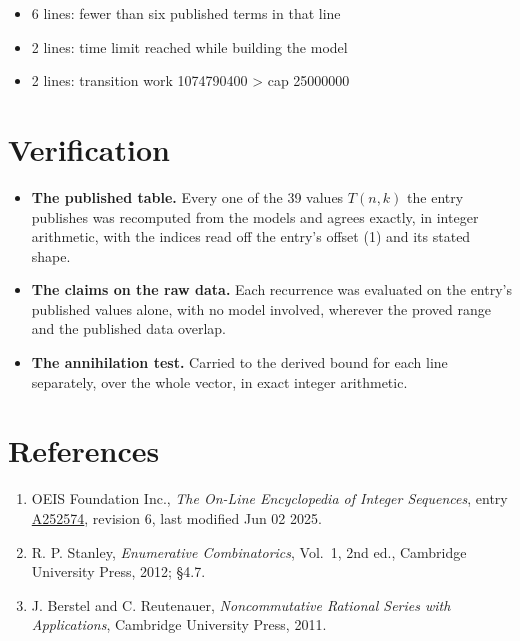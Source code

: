 \documentclass[11pt]{article}
\theoremstyle{definition}
\begin{document}
\begin{itemize}

\item 6 lines: fewer than six published terms in that line

\item 2 lines: time limit reached while building the model

\item 2 lines: transition work 1074790400 > cap 25000000

\end{itemize}

\section{Verification}

\begin{itemize}

\item {\bfseries The published table.} Every one of the 39 values $T(n,k)$ the entry publishes was recomputed from the models and agrees exactly, in integer arithmetic, with the indices read off the entry's offset (1) and its stated shape.

\item {\bfseries The claims on the raw data.} Each recurrence was evaluated on the entry's published values alone, with no model involved, wherever the proved range and the published data overlap.

\item {\bfseries The annihilation test.} Carried to the derived bound for each line separately, over the whole vector, in exact integer arithmetic.

\end{itemize}

\section{References}

\begin{enumerate}

\item OEIS Foundation Inc., \emph{The On-Line Encyclopedia of Integer Sequences}, entry \href{https://oeis.org/A252574}{A252574}, revision 6, last modified Jun 02 2025.

\item R. P. Stanley, \emph{Enumerative Combinatorics}, Vol.~1, 2nd ed., Cambridge University Press, 2012; \S4.7.

\item J. Berstel and C. Reutenauer, \emph{Noncommutative Rational Series with Applications}, Cambridge University Press, 2011.

\end{enumerate}
\end{document}
